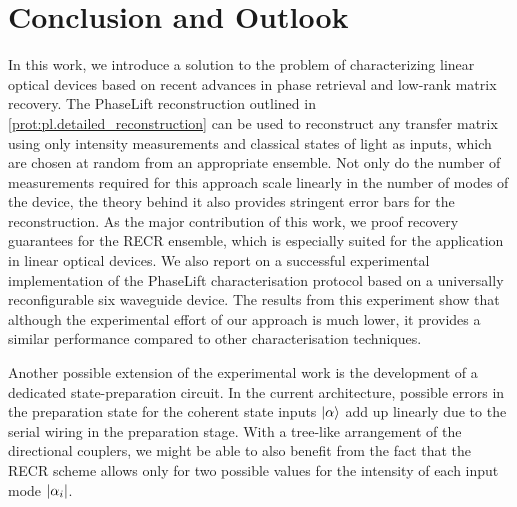 \section{Conclusion and Outlook}

In this work, we introduce a solution to the problem of characterizing linear optical devices based on recent advances in phase retrieval and low-rank matrix recovery.
The PhaseLift reconstruction outlined in \cref{prot:pl.detailed_reconstruction} can be used to reconstruct any transfer matrix using only intensity measurements and classical states of light as inputs, which are chosen at random from an appropriate ensemble.
Not only do the number of measurements required for this approach scale linearly in the number of modes of the device, the theory behind it also provides stringent error bars for the reconstruction.
As the major contribution of this work, we proof recovery guarantees for the RECR ensemble, which is especially suited for the application in linear optical devices.
We also report on a successful experimental implementation of the PhaseLift characterisation protocol based on a universally reconfigurable six waveguide device.
The results from this experiment show that although the experimental effort of our approach is much lower, it provides a similar performance compared to other characterisation techniques.

Another possible extension of the experimental work is the development of a dedicated state-preparation circuit.
In the current architecture, possible errors in the preparation state for the coherent state inputs $\ket{\alpha}$ add up linearly due to the serial wiring in the preparation stage.
With a tree-like arrangement of the directional couplers, we might be able to also benefit from the fact that the RECR scheme allows only for two possible values for the intensity of each input mode ${\vert\alpha_i\vert}$.
